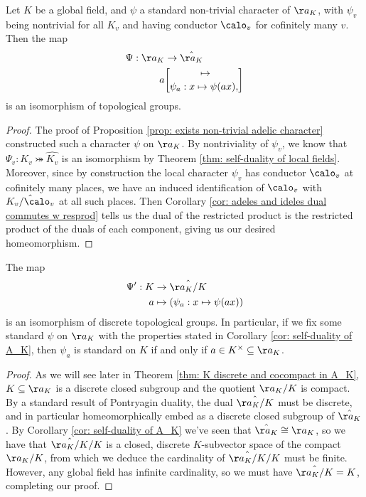 \documentclass[11pt, x11names, openany]{book}
\begin{document}
\begin{corollary}
    \label{cor: self-duality of A_K}
    Let $K$ be a global field, and $\psi$ a standard non-trivial character of $\aa_K$, with $\psi_v$ being nontrivial for all $K_v$ and having conductor $\calo_v$ for cofinitely many $v$. Then the map
    \begin{align*}
    \Psi: \aa_K &\to \hat{\aa_K}\\
    a & \mapsto \brack{\psi_a: x \mapsto \psi(ax)},
    \end{align*}
    is an isomorphism of topological groups.
\end{corollary}
\begin{proof}
The proof of Proposition \ref{prop: exists non-trivial adelic character} constructed such a character $\psi$ on $\aa_K$. By nontriviality of $\psi_v$, we know that $\Psi_v: K_v \bij \hat{K_v}$ is an isomorphism by Theorem \ref{thm: self-duality of local fields}. Moreover, since by construction the local character $\psi_v$ has conductor $\calo_v$ at cofinitely many places, we have an induced identification of $\calo_v$ with $\hat{K_v/\calo_v}$ at all such places. Then Corollary \ref{cor: adeles and ideles dual commutes w resprod} tells us the dual of the restricted product is the restricted product of the duals of each component, giving us our desired homeomorphism.
\end{proof}




\begin{proposition}
    \label{prop: K = dual of A_K/K}
    The map
    \begin{align*}
        \Psi': K & \to \hat{\aa_K/K}\\
        a & \mapsto (\psi_a: x \mapsto \psi(ax)) 
    \end{align*}
    is an isomorphism of discrete topological groups. In particular, if we fix some standard $\psi$ on $\aa_K$ with the properties stated in Corollary \ref{cor: self-duality of A_K}, then $\psi_a$ is standard on $K$ if and only if $a \in K^\times \subseteq \aa_K$.
\end{proposition}
\begin{proof}
As we will see later in Theorem \ref{thm: K discrete and cocompact in A_K}, $K \subseteq \aa_K$ is a discrete closed subgroup and the quotient $\aa_K/K$ is compact. By a standard result of Pontryagin duality, the dual $\hat{\aa_K/K}$ must be discrete, and in particular homeomorphically embed as a discrete closed subgroup of $\hat{\aa_K}$. By Corollary \ref{cor: self-duality of A_K} we've seen that $\hat{\aa_K} \cong \aa_K$, so we have that $\hat{\aa_K/K}/K$ is a closed, discrete $K$-subvector space of the compact $\aa_K/K$, from which we deduce the cardinality of $\hat{\aa_K/K}/K$ must be finite. However, any global field has infinite cardinality, so we must have $\hat{\aa_K/K} = K$, completing our proof.
\end{proof}
\end{document}
